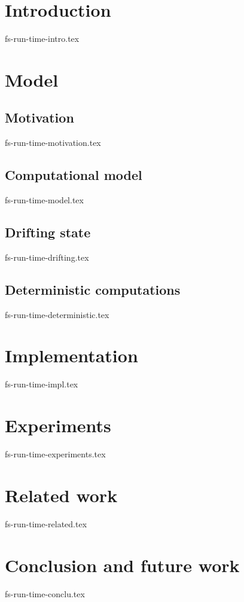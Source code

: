 \documentclass{llncs}
\begin{document}
\section {Introduction}
 {fs-run-time-intro.tex}

\section {Model}
\label {fs-model}

\subsection {Motivation}
 {fs-run-time-motivation.tex}

\subsection {Computational model}
 {fs-run-time-model.tex}

 \subsection{Drifting state}
  {fs-run-time-drifting.tex}

\subsection {Deterministic computations}
 {fs-run-time-deterministic.tex}

\section {Implementation}
 {fs-run-time-impl.tex}

\section {Experiments}
 {fs-run-time-experiments.tex}

\section {Related work}
 {fs-run-time-related.tex}

\section {Conclusion and future work}
 {fs-run-time-conclu.tex}




\end{document}
